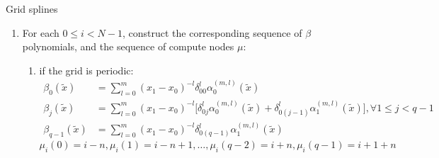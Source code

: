\documentclass[11pt]{article}
\begin{document}
\begin{small}
\begin{paragraph}{Grid splines}
\begin{enumerate}
\begin{enumerate}
                        Note that since the distances between successive points on the grid is constant, the
                        resulting $\delta_{ij}^l$ will in fact be independent of $i$.
                    \item
                        otherwise:

                        \begin{enumerate}
                            \item
                                case $i < n$:
                                $$\nu_i(0) = 0, \nu_i(1) = 1, \ldots, \nu_i(q - 2) = q-2$$
                            \item
                                case $n \leq i < N - n$:
                                $$\nu_i(0) = i - n, \nu_i(1) = i - n + 1, \ldots, \nu_i(q - 2) = i+n$$
                            \item
                                case $N-n \leq i$:
                                $$\nu_i(0) = N - q + 1, \nu_i(1) = N - q + 2, \ldots, \nu_i(q - 2) = N-1$$
                        \end{enumerate}
                \end{enumerate}
            \item
                For each $0 \leq i < N-1$, construct the corresponding sequence of $\beta$ polynomials, and the
                sequence of compute nodes $\mu$:
                \begin{enumerate}
                    \item
                        if the grid is periodic:
                        \begin{align}
                            \beta_{0}(\tilde{x}) &=
                                \sum_{l = 0}^m
                                (x_1 - x_0)^{-l}
                                \delta_{00}^l \alpha_0^{(m, l)}(\tilde{x}) \\
                            \beta_{j}(\tilde{x}) &=
                                \sum_{l = 0}^m
                                (x_1 - x_0)^{-l}
                                \Big[\delta_{0j}^l \alpha_0^{(m, l)}(\tilde{x}) +
                                     \delta_{0(j-1)}^l \alpha_1^{(m, l)}(\tilde{x})\Big],
                            \forall 1 \leq j < q-1 \\
                            \beta_{q-1}(\tilde{x}) &=
                                \sum_{l = 0}^m
                                (x_1 - x_0)^{-l}
                                \delta_{0(q-1)}^l \alpha_1^{(m, l)}(\tilde{x})
                        \end{align}
                        \begin{equation}
                            \mu_i(0) = i-n, \mu_i(1) = i-n+1, \ldots, \mu_i(q-2) = i+n, \mu_i(q-1) = i+1+n
                        \end{equation}


\end{enumerate}
\end{enumerate}
\end{paragraph}
\end{small}
\end{document}
